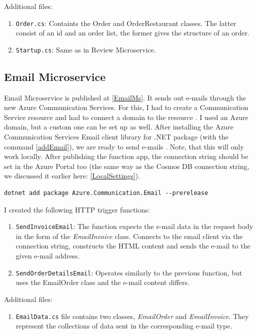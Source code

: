 Additional files: 

\begin{enumerate}
	\item \verb+Order.cs+: Containts the Order and OrderRestaurant classes. The latter consist of an id and an order list, the former gives the structure of an order.
	
	\item \verb+Startup.cs+: Same as in Review Microservice.
\end{enumerate}

\subsection{Email Microservice}\label{EmailMicroservice}

Email Microservice is published at \ref{EmailMs}. It sends out e-mails through the new Azure Communication Services. For this, I had to create a Communication Service resource \cite{CommunicationResource} and had to connect a domain to the resource \cite{ConnectEmailDomain}. I used an Azure domain, but a custom one can be set up as well. After installing the Azure Communication Services Email client library for .NET package (with the command \ref{addEmail}), we are ready to send e-mails \cite{SendEmail}. Note, that this will only work locally. After publishing the function app, the connection string should be set in the Azure Portal too (the same way as the Cosmos DB connection string, we discussed it earlier here: \ref{LocalSettings}). 

\lstset{ breaklines=true }
\begin{lstlisting}[frame=single,float=!ht, caption=Adding the e-mail package to a Function App, label=addEmail]
	dotnet add package Azure.Communication.Email --prerelease 
\end{lstlisting}

 I created the following HTTP trigger functions:

\begin{enumerate}
	\item \verb+SendInvoiceEmail+: The function expects the e-mail data in the request body in the form of the \emph{EmailInvoice} class. Connects to the email client via the connection string, constructs the HTML content and sends the e-mail to the given e-mail address.
	
	\item \verb+SendOrderDetailsEmail+: Operates similarly to the previous function, but uses the EmailOrder class and the e-mail content differs.
\end{enumerate}

Additional files: 

\begin{enumerate}
	\item \verb+EmailData.cs+ file contains two classes, \emph{EmailOrder} and \emph{EmailInvoice}. They represent the collections of data sent in the corresponding e-mail type.
\end{enumerate}